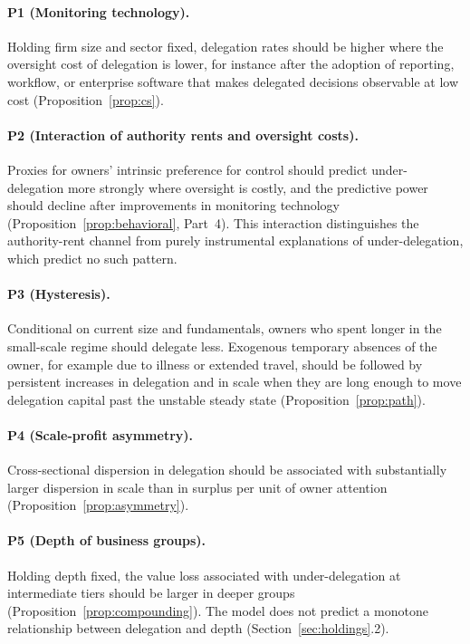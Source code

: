 \documentclass[11pt,a4paper]{article}
\theoremstyle{plain}
\begin{document}
\paragraph{P1 (Monitoring technology).} Holding firm size and sector fixed, delegation rates should be higher where the oversight cost of delegation is lower, for instance after the adoption of reporting, workflow, or enterprise software that makes delegated decisions observable at low cost (Proposition~\ref{prop:cs}).

\paragraph{P2 (Interaction of authority rents and oversight costs).} Proxies for owners' intrinsic preference for control should predict under-delegation more strongly where oversight is costly, and the predictive power should decline after improvements in monitoring technology (Proposition~\ref{prop:behavioral}, Part~4). This interaction distinguishes the authority-rent channel from purely instrumental explanations of under-delegation, which predict no such pattern.

\paragraph{P3 (Hysteresis).} Conditional on current size and fundamentals, owners who spent longer in the small-scale regime should delegate less. Exogenous temporary absences of the owner, for example due to illness or extended travel, should be followed by persistent increases in delegation and in scale when they are long enough to move delegation capital past the unstable steady state (Proposition~\ref{prop:path}).

\paragraph{P4 (Scale-profit asymmetry).} Cross-sectional dispersion in delegation should be associated with substantially larger dispersion in scale than in surplus per unit of owner attention (Proposition~\ref{prop:asymmetry}).

\paragraph{P5 (Depth of business groups).} Holding depth fixed, the value loss associated with under-delegation at intermediate tiers should be larger in deeper groups (Proposition~\ref{prop:compounding}). The model does not predict a monotone relationship between delegation and depth (Section~\ref{sec:holdings}.2).
\end{document}
